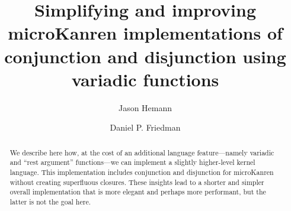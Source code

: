 \documentclass[sigplan,screen,draft,anonymous,review,natbib=false]{acmart}
\begin{document}
\title[Improving microKanren with Variadics]{Simplifying and improving microKanren implementations of
  conjunction and disjunction using variadic functions}

\author{Jason Hemann}
\author{Daniel P. Friedman}

\renewcommand{\shortauthors}{Hemann et al.}

\begin{abstract}
  We describe here how, at the cost of an additional language
  feature---namely variadic and \enquote{rest argument} functions---we
  can implement a slightly higher-level kernel language. This
  implementation includes conjunction and disjunction for microKanren
  without creating superfluous closures. These insights lead to a
  shorter and simpler overall implementation that is more elegant and perhaps
  more performant, but the latter is not the goal here.
\end{abstract}


\keywords{}

\maketitle
\end{document}
